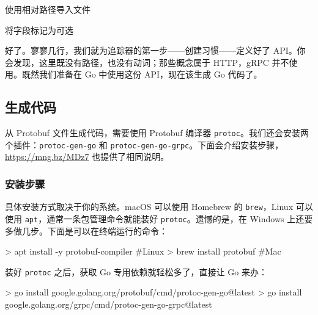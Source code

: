 
\begin{codeannotations}
\item 使用相对路径导入文件
\item 将字段标记为可选
\end{codeannotations}

好了。寥寥几行，我们就为追踪器的第一步——创建习惯——定义好了 API。你会发现，这里既没有路径，也没有动词；那些概念属于 HTTP，gRPC 并不使用。既然我们准备在 Go 中使用这份 API，现在该生成 Go 代码了。

\subsection{生成代码}

从 Protobuf 文件生成代码，需要使用 Protobuf 编译器 \texttt{protoc}。我们还会安装两个插件：\texttt{protoc-gen-go} 和 \texttt{protoc-gen-go-grpc}。下面会介绍安装步骤，\url{https://mng.bz/MDz7} 也提供了相同说明。

\subsubsection{安装步骤}

具体安装方式取决于你的系统。macOS 可以使用 Homebrew 的 \texttt{brew}，Linux 可以使用 \texttt{apt}，通常一条包管理命令就能装好 \texttt{protoc}。遗憾的是，在 Windows 上还要多做几步。下面是可以在终端运行的命令：

\begin{shellcode}[]
> apt install -y protobuf-compiler #Linux
> brew install protobuf #Mac
\end{shellcode}

装好 \texttt{protoc} 之后，获取 Go 专用依赖就轻松多了，直接让 Go 来办：

\begin{shellcode}[]
> go install google.golang.org/protobuf/cmd/protoc-gen-go@latest
> go install google.golang.org/grpc/cmd/protoc-gen-go-grpc@latest
\end{shellcode}

